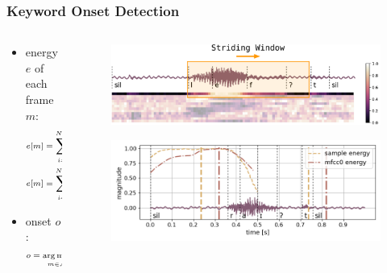 \begin{frame}
  \frametitle{Keyword Onset Detection}
  \vspace{-0.75cm}
  \begin{columns}
    \begin{column}{0.5\textwidth}
      \begin{itemize}
        \item energy $e$ of each frame $m$:
        \begin{equation*}
          \scriptsize
          \begin{aligned}
            e[m] &= \sum_{i=0}^{N-1} \abs{x[m + i]}^2, \quad \mathrm{or}\\
            e[m] &= \sum_{i=0}^{N-1} u_0[m + i],\\
          \end{aligned}
        \end{equation*}

         \item onset $o$:
        \begin{equation*}
          \scriptsize
          \begin{aligned}
            o &= \underset{m \in \mathcal{M}}{\arg \max} \, e[m]
          \end{aligned}
        \end{equation*}
      \end{itemize}
    \end{column}
    \begin{column}{0.5\textwidth}
      \centering
      \begin{figure} \hspace{0.75cm} \includegraphics[width=1.0\textwidth]{../3_signal/figs/signal_onset_window.pdf} \end{figure}
      \begin{figure} \includegraphics[width=1.0\textwidth]{../3_signal/figs/signal_onset_showcase_right0.png} \end{figure}
      \vfill
    \end{column}
  \end{columns}
\end{frame}
